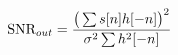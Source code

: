 \documentclass[preview]{standalone}
\begin{document}
\begin{align*}
\special{dvisvgm:raw <g id='unique000'>}\text{SNR}_{out}=\frac{\big(\sum s[n]h[-n]\big)^2}{\sigma^2\sum h^2[-n]}\special{dvisvgm:raw </g>}
\end{align*}
\end{document}
